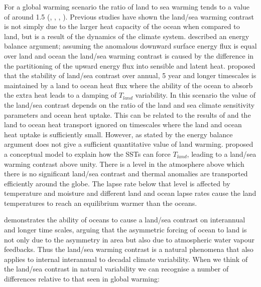 For a global warming scenario the ratio of land to sea warming tends to a value 
of around 1.5  (\citealt{Sutton2007}, \citealt{Lambert2007}, 
\citealt{Compo2008}, \citealt{Dommenget2009}). Previous studies have shown the 
land/sea warming contrast is not simply due to the larger heat capacity of the 
ocean when compared to land, but is a result of the dynamics of the climate 
system.  \citet{Sutton2007} described an energy balance argument; assuming the 
anomalous downward surface energy flux is equal over land and ocean 
\citet{Huntingford2000} the land/sea warming contrast is caused by the 
difference in the partitioning of the upward energy flux into sensible and 
latent heat.  \citet*{Lambert2007} proposed that the stability of land/sea 
contrast over annual, 5 year and longer timescales is maintained by a land to 
ocean heat flux where the ability of the ocean to absorb the extra heat leads to 
a damping of $T_{land}$ variability. In this scenario the value of the land/sea 
contrast depends on the ratio of the land and sea climate sensitivity parameters 
and ocean heat uptake. This can be related to the results of \citet{Sutton2007} 
and the land to ocean heat transport ignored on timescales where the land and 
ocean heat uptake is sufficiently small.  However, as stated by 
\citet{Byrne2013a} the energy balance argument does not give a sufficient 
quantitative value of land warming.  \citet{Joshi2008} proposed a conceptual 
model to explain how the SSTs can force $T_{land}$, leading to a land/sea 
warming contrast above unity.  There is a level in the atmosphere above which 
there is no significant land/sea contrast and thermal anomalies are transported 
efficiently around the globe. The lapse rate below that level is affected by 
temperature and moisture and different land and ocean lapse rates cause the land 
temperatures to reach an equilibrium warmer than the oceans.  

\citet{Dommenget2009} demonstrates the ability of oceans to cause a land/sea 
contrast on interannual and longer time scales, arguing that the asymmetric 
forcing of ocean to land is not only due to the asymmetry in area but also due 
to atmospheric water vapour feedbacks. Thus the land/sea warming contrast is a 
natural phenomena that also applies to internal interannual to decadal climate 
variability. When we think of the land/sea contrast in natural variability we 
can recognise a number of differences relative to that seen in global warming: 

